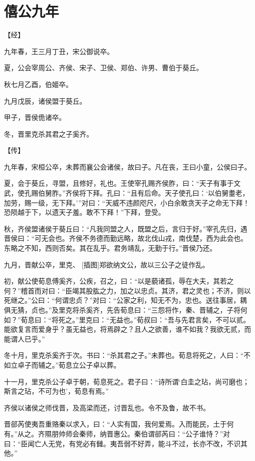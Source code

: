 \documentclass[a4paper,12pt,UTF8,twoside]{ctexbook}
\begin{document}
\section{僖公九年}



【经】

九年春，王三月丁丑，宋公御说卒。

夏，公会宰周公、齐侯、宋子、卫侯、郑伯、许男、曹伯于葵丘。

秋七月乙酉，伯姬卒。

九月戊辰，诸侯盟于葵丘。

甲子，晋侯佹诸卒。

冬，晋里克杀其君之子奚齐。

【传】

九年春，宋桓公卒，未葬而襄公会诸侯，故曰子。凡在丧，王曰小童，公侯曰子。

夏，会于葵丘，寻盟，且修好，礼也。王使宰孔赐齐侯胙，曰：“天子有事于文武，使孔赐伯舅胙。”齐侯将下拜。孔曰：“且有后命。天子使孔曰：‘以伯舅耋老，加劳，赐一级，无下拜。’”对曰：“天威不违颜咫尺，小白余敢贪天子之命无下拜！恐陨越于下，以遗天子羞。敢不下拜！”下拜，登受。

秋，齐侯盟诸侯于葵丘曰：“凡我同盟之人，既盟之后，言归于好。”宰孔先归，遇晋侯曰：“可无会也。齐侯不务德而勤远略，故北伐山戎，南伐楚，西为此会也。东略之不知，西则否矣。其在乱乎。君务靖乱，无勤于行。”晋侯乃还。

九月，晋献公卒，里克、 [插图]郑欲纳文公，故以三公子之徒作乱。

初，献公使荀息傅奚齐，公疾，召之，曰：“以是藐诸孤，辱在大夫，其若之何？”稽首而对曰：“臣竭其股肱之力，加之以忠贞。其济，君之灵也；不济，则以死继之。”公曰：“何谓忠贞？”对曰：“公家之利，知无不为，忠也。送往事居，耦俱无猜，贞也。”及里克将杀奚齐，先告荀息曰：“三怨将作，秦、晋辅之，子将何如？”荀息曰：“将死之。”里克曰：“无益也。”荀叔曰：“吾与先君言矣，不可以贰。能欲复言而爱身乎？虽无益也，将焉辟之？且人之欲善，谁不如我？我欲无贰，而能谓人已乎。”

冬十月，里克杀奚齐于次。书曰：“杀其君之子。”未葬也。荀息将死之，人曰：“不如立卓子而辅之。”荀息立公子卓以葬。

十一月，里克杀公子卓于朝，荀息死之。君子曰：“诗所谓‘白圭之玷，尚可磨也；斯言之玷，不可为也’，荀息有焉。”

齐侯以诸侯之师伐晋，及高梁而还，讨晋乱也。令不及鲁，故不书。

晋郤芮使夷吾重赂秦以求入，曰：“人实有国，我何爱焉。入而能民，土于何有。”从之。齐隰朋帅师会秦师，纳晋惠公。秦伯谓郤芮曰：“公子谁恃？”对曰：“臣闻亡人无党，有党必有雠。夷吾弱不好弄，能斗不过，长亦不改，不识其他。”
\end{document}

